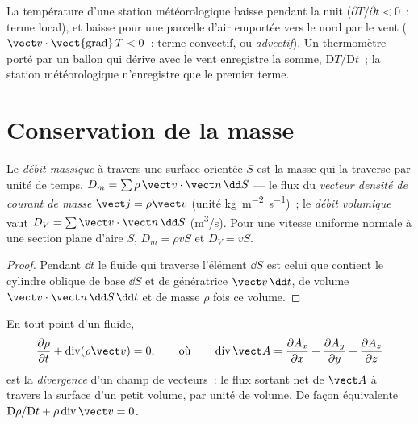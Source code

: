 \begin{example}\label{ex:b2:fluid-kinematics:weather}
La température d'une station météorologique baisse pendant la nuit ($\partial T/
\partial t < 0$~: terme local), et baisse pour une parcelle d'air emportée vers le nord par
le vent ($\vect v\cdot\operatorname{\vect{grad}}T < 0$~: terme convectif, ou
\emph{advectif}). Un thermomètre porté par un ballon qui dérive avec le vent
enregistre la somme, $\mathrm DT/\mathrm Dt$~; la station météorologique n'enregistre que
le premier terme.
\end{example}

\section{Conservation de la masse}

\begin{definition}\label{def:b2:fluid-kinematics:flowrate}
Le \emph{débit massique} à travers une surface orientée $S$ est la masse
qui la traverse par unité de temps, $D_m = \sum\rho\,\vect v\cdot\vect n\,\dd S$ ---
le flux du \emph{vecteur densité de courant de masse} $\vect j = \rho\vect v$ (unité
\unit{kg.m^{-2}.s^{-1}})~; le \emph{débit volumique} vaut $D_V = \sum\vect v
\cdot\vect n\,\dd S$ (\unit{m^3/s}). Pour une vitesse uniforme normale à une section
plane d'aire $S$, $D_m = \rho vS$ et $D_V = vS$.
\end{definition}

\begin{proof}
Pendant $\dd t$ le fluide qui traverse l'élément $\dd S$ est celui que contient
le cylindre oblique de base $\dd S$ et de génératrice $\vect v\,\dd t$, de
volume $\vect v\cdot\vect n\,\dd S\,\dd t$ et de masse $\rho$ fois ce volume.
\end{proof}

\begin{theorem}\label{thm:b2:fluid-kinematics:continuity}
En tout point d'un fluide,
\[
\frac{\partial\rho}{\partial t} + \operatorname{div}(\rho\vect v) = 0 ,
\qquad\text{où}\qquad
\operatorname{div}\vect A = \frac{\partial A_x}{\partial x} + \frac{\partial A_y}{\partial y} +
\frac{\partial A_z}{\partial z}
\]
est la \emph{divergence} d'un champ de vecteurs~: le flux sortant net de
$\vect A$ à travers la surface d'un petit volume, par unité de volume.
De façon équivalente $\mathrm D\rho/\mathrm Dt + \rho\operatorname{div}\vect v = 0$.
\end{theorem}

